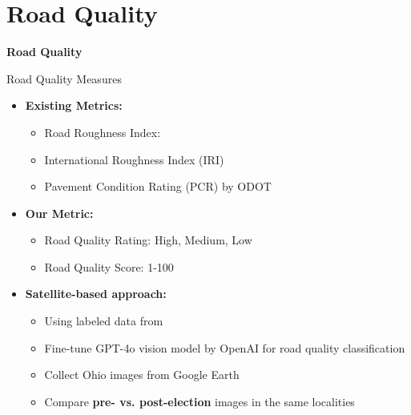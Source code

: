 \documentclass{beamer}
\begin{document}
\section{Road Quality}

\begin{frame}
    \begin{center}
        \vspace{2cm}
        {\LARGE \textbf{Road Quality}}
    \end{center}
\end{frame}

\begin{frame}[label=road_quality_measures]{Road Quality Measures}
    \begin{itemize}
        \item \textbf{Existing Metrics:}
            \begin{itemize}
                \item Road Roughness Index: \cite{currier2023}
                \item International Roughness Index (IRI)
                \item Pavement Condition Rating (PCR) by ODOT
            \end{itemize}        
        \item \textbf{Our Metric:}
            \begin{itemize}
                \item Road Quality Rating: High, Medium, Low
                \item Road Quality Score: 1-100
            \end{itemize}                
        \item \textbf{Satellite-based approach:}
            \begin{itemize}
                \item Using labeled data from \cite{brewer2021}
                \item Fine-tune GPT-4o vision model by OpenAI for road quality classification
                \item Collect Ohio images from Google Earth
                \item Compare \textbf{pre- vs. post-election} images in the same localities
            \end{itemize}

\end{itemize}
\end{frame}
\end{document}
